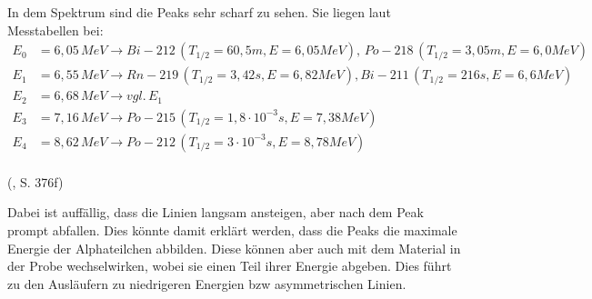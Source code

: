 In dem Spektrum sind die Peaks sehr scharf zu sehen. Sie liegen laut Messtabellen bei: \\

\begin{align*}
    E_0 &= 6,05 \, MeV \to Bi-212 \, (T_{1/2} = 60,5m, E = 6,05 MeV),\, Po-218 \, (T_{1/2} = 3,05m, E = 6,0 MeV) \\
    E_1 &= 6,55 \, MeV \to Rn-219 \, (T_{1/2} = 3,42s, E = 6,82 MeV), Bi-211 \, (T_{1/2} = 216s, E = 6,6 MeV)\\
    E_2 &= 6,68 \, MeV \to vgl. \, E_1 \\
    E_3 &= 7,16 \, MeV \to Po-215 \, (T_{1/2} = 1,8 \cdot 10^{-3}s, E = 7,38 MeV) \\
    E_4 &= 8,62 \, MeV \to Po-212 \, (T_{1/2} = 3 \cdot 10^{-3}s, E = 8,78 MeV) \\
\end{align*}

(\cite{Mende2016}, S. 376f)

Dabei ist auffällig, dass die Linien langsam ansteigen, aber nach dem Peak prompt abfallen. Dies könnte damit erklärt werden, dass 
die Peaks die maximale Energie der Alphateilchen abbilden. Diese können aber auch mit dem Material in der Probe wechselwirken, wobei 
sie einen Teil ihrer Energie abgeben. Dies führt zu den Ausläufern zu niedrigeren Energien bzw asymmetrischen Linien. 



